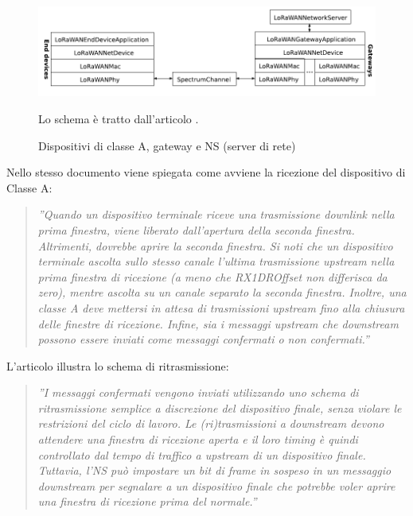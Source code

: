 \documentclass[a4paper]{report} %
\begin{document}
\begin{figure}
\centering
\includegraphics[scale=.5]{Immagini/ClasseA.png}

\caption{Dispositivi di classe A, gateway e NS (server di rete)}
\label{fig:classea}
Lo schema è tratto dall'articolo \cite{art:rif.49}. \\
\end{figure}

Nello stesso documento viene spiegata come avviene la ricezione del dispositivo di Classe A:
\begin{quote}
	\textit{''Quando un dispositivo terminale riceve una trasmissione downlink nella prima finestra, viene liberato dall'apertura della seconda finestra. Altrimenti, dovrebbe aprire la seconda finestra. Si noti che un dispositivo terminale ascolta sullo stesso canale l'ultima trasmissione upstream nella prima finestra di ricezione (a meno che RX1DROffset non differisca da zero), mentre ascolta su un canale separato la seconda finestra. Inoltre, una classe A deve mettersi in attesa di trasmissioni upstream fino alla chiusura delle finestre di ricezione. Infine, sia i messaggi upstream che downstream possono essere inviati come messaggi confermati o non confermati.''} 
\end{quote}
L'articolo \cite{art:rif.49} illustra lo schema di ritrasmissione:
\begin{quote}	
	\textit{''I messaggi confermati vengono inviati utilizzando uno schema di ritrasmissione semplice a discrezione del dispositivo finale, senza violare le restrizioni del ciclo di lavoro. Le (ri)trasmissioni a downstream devono attendere una finestra di ricezione aperta e il loro timing è quindi controllato dal tempo di traffico a upstream di un dispositivo finale. Tuttavia, l'NS può impostare un bit di frame in sospeso in un messaggio downstream per segnalare a un dispositivo finale che potrebbe voler aprire una finestra di ricezione prima del normale.''}
\end{quote}
\end{document}
